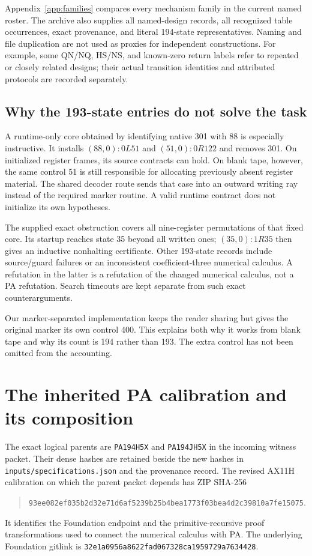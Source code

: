 \documentclass[11pt,letterpaper]{article}
\newcommand{\file}[1]{\texttt{\nolinkurl{#1}}}
\begin{document}
Appendix~\ref{app:families} compares every mechanism family in the current
named roster. The archive also supplies all named-design records, all
recognized table occurrences, exact provenance, and literal 194-state
representatives. Naming and file duplication are not used as proxies for
independent constructions. For example, some QN/NQ, HS/NS, and known-zero
return labels refer to repeated or closely related designs; their actual
transition identities and attributed protocols are recorded separately.

\subsection{Why the 193-state entries do not solve the task}
A runtime-only core obtained by identifying native 301 with 88 is especially
instructive. It installs $(88,0):0L51$ and $(51,0):0R122$ and removes 301.
On initialized register frames, its source contracts can hold. On blank
tape, however, the same control 51 is still responsible for allocating
previously absent register material. The shared decoder route sends that
case into an outward writing ray instead of the required marker routine.
A valid runtime contract does not initialize its own hypotheses.

The supplied exact obstruction covers all nine-register permutations of
that fixed core. Its startup reaches state 35 beyond all written ones;
$(35,0):1R35$ then gives an inductive nonhalting certificate. Other 193-state
records include source/guard failures or an inconsistent coefficient-three
numerical calculus. A refutation in the latter is a refutation of the
changed numerical calculus, not a PA refutation. Search timeouts are kept
separate from such exact counterarguments.

Our marker-separated implementation keeps the reader sharing but gives the
original marker its own control 400. This explains both why it works from
blank tape and why its count is 194 rather than 193. The extra control has
not been omitted from the accounting.



\section{The inherited PA calibration and its composition}
\label{sec:calibration}
The exact logical parents are \file{PA194H5X} and \file{PA194JH5X} in the
incoming witness packet. Their dense hashes are retained beside the new
hashes in \file{inputs/specifications.json} and the provenance record.
The revised AX11H calibration on which the parent packet depends has ZIP
SHA-256
\begin{quote}\small\file{93ee082ef035b2d32e71d6af5239b25b4bea1773f03bea4d2c39810a7fe15075}.\end{quote}
It identifies the Foundation endpoint and the primitive-recursive proof
transformations used to connect the numerical calculus with PA. The
underlying Foundation gitlink is
\file{32e1a0956a8622fad067328ca1959729a7634428}.
\end{document}

